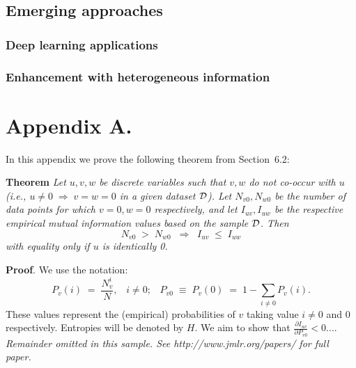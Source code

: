 \documentclass[twoside,11pt]{article}
\newcommand{\dataset}{{\cal D}}
\newcommand{\fracpartial}[2]{\frac{\partial #1}{\partial  #2}}
\begin{document}
\subsection{Emerging approaches}
\subsubsection{Deep learning applications}
\subsubsection{Enhancement with heterogeneous information}




\newpage

\appendix
\section*{Appendix A.}
\label{app:theorem}



In this appendix we prove the following theorem from
Section~6.2:

\noindent
{\bf Theorem} {\it Let $u,v,w$ be discrete variables such that $v, w$ do
not co-occur with $u$ (i.e., $u\neq0\;\Rightarrow \;v=w=0$ in a given
dataset $\dataset$). Let $N_{v0},N_{w0}$ be the number of data points for
which $v=0, w=0$ respectively, and let $I_{uv},I_{uw}$ be the
respective empirical mutual information values based on the sample
$\dataset$. Then
\[
	N_{v0} \;>\; N_{w0}\;\;\Rightarrow\;\;I_{uv} \;\leq\;I_{uw}
\]
with equality only if $u$ is identically 0.} \hfill\BlackBox

\noindent
{\bf Proof}. We use the notation:
\[
P_v(i) \;=\;\frac{N_v^i}{N},\;\;\;i \neq 0;\;\;\;
P_{v0}\;\equiv\;P_v(0)\; = \;1 - \sum_{i\neq 0}P_v(i).
\]
These values represent the (empirical) probabilities of $v$
taking value $i\neq 0$ and 0 respectively.  Entropies will be denoted
by $H$. We aim to show that $\fracpartial{I_{uv}}{P_{v0}} < 0$....\\

{\noindent \em Remainder omitted in this sample. See http://www.jmlr.org/papers/ for full paper.}

\vskip 0.2in

\end{document}
